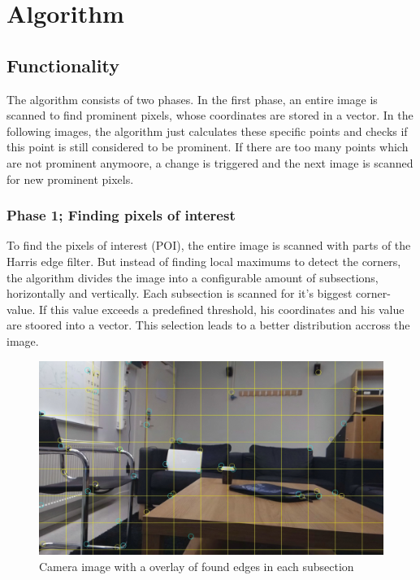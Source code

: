 \chapter{Algorithm }
\section{Functionality}
The algorithm consists of two phases. In the first phase, an entire image is scanned to find prominent pixels, whose coordinates are stored in a vector. In the following images, the algorithm just calculates these specific points and checks if this point is still considered to be prominent. If there are too many points which are not prominent anymoore, a change is triggered and the next image is scanned for new prominent pixels. 

\subsection{Phase 1; Finding pixels of interest}
To find the pixels of interest (POI), the entire image is scanned with parts of the Harris edge filter.  But instead of finding local maximums to detect the corners, the algorithm divides the image into a configurable amount of subsections, horizontally and vertically. Each subsection is scanned for it's biggest corner-value. If this value exceeds a predefined threshold, his coordinates and his value are stoored into a vector. This selection leads to a better distribution accross the image. 

\begin{figure}[h!]
	\centering
	\includegraphics[width=0.9\linewidth]{bin/hotspots}
	\caption{Camera image with a overlay of found edges in each subsection}
	\label{fig:hotspots}
\end{figure} 


